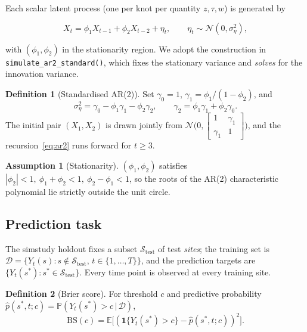 \documentclass[11pt]{article}
\theoremstyle{definition}
\newtheorem{definition}{Definition}
\newtheorem{assumption}{Assumption}
\newcommand{\E}{\mathbb{E}}
\renewcommand{\Pr}{\mathbb{P}}
\newcommand{\Norm}{\mathcal{N}}
\newcommand{\D}{\mathcal{D}}
\newcommand{\indicator}{\mathbf{1}}
\newcommand{\given}{\,\vert\,}
\begin{document}
Each scalar latent process (one per knot per quantity $z, \tau, w$) is
generated by

\begin{equation}
  X_t = \phi_1 X_{t-1} + \phi_2 X_{t-2} + \eta_t,
  \qquad \eta_t \sim \Norm(0, \sigma_\eta^2),
  \label{eq:ar2}
\end{equation}

with $(\phi_1, \phi_2)$ in the stationarity region. We adopt the
construction in \verb|simulate_ar2_standard()|, which fixes the
stationary variance and \emph{solves} for the innovation variance.

\begin{definition}[Standardised AR(2)]
\label{def:standardised}
Set $\gamma_0 = 1$, $\gamma_1 = \phi_1 / (1 - \phi_2)$, and
\begin{equation}
  \sigma_\eta^2
    = \gamma_0 - \phi_1 \gamma_1 - \phi_2 \gamma_2,
  \qquad \gamma_2 = \phi_1 \gamma_1 + \phi_2 \gamma_0.
  \label{eq:innovvar}
\end{equation}
The initial pair $(X_1, X_2)$ is drawn jointly from
$\Norm\!\big(0, [\begin{smallmatrix} 1 & \gamma_1 \\ \gamma_1 & 1
\end{smallmatrix}]\big)$, and the recursion~\eqref{eq:ar2} runs
forward for $t \ge 3$.
\end{definition}

\begin{assumption}[Stationarity]
\label{assn:stationary}
$(\phi_1, \phi_2)$ satisfies
$|\phi_2| < 1, \ \phi_1 + \phi_2 < 1, \ \phi_2 - \phi_1 < 1$,
so the roots of the AR(2) characteristic polynomial lie strictly
outside the unit circle.
\end{assumption}

\subsection{Prediction task}

The simstudy holdout fixes a subset $\mathcal S_{\mathrm{test}}$ of
test \emph{sites}; the training set is
$\D = \{Y_t(s) : s \notin \mathcal S_{\mathrm{test}}, \, t \in
\{1, \dots, T\}\}$, and the prediction targets are
$\{Y_t(s^*) : s^* \in \mathcal S_{\mathrm{test}}\}$. Every time point
is observed at every training site.

\begin{definition}[Brier score]
\label{def:brier}
For threshold $c$ and predictive probability
$\hat p(s^*, t; c) = \Pr(Y_t(s^*) > c \given \D)$,
\begin{equation}
  \mathrm{BS}(c) = \E\big[(\indicator\{Y_t(s^*) > c\}
                        - \hat p(s^*, t; c))^2\big].
  \label{eq:brier}
\end{equation}
\end{definition}
\end{document}
